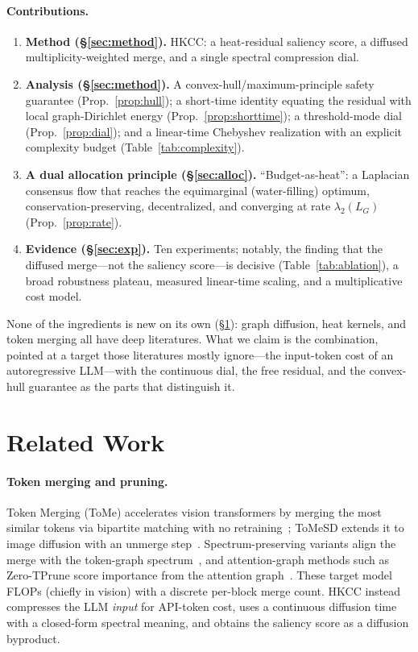 \documentclass[11pt]{article}
\begin{document}
\paragraph{Contributions.}
\begin{enumerate}
\item \textbf{Method (\S\ref{sec:method}).} HKCC: a heat-residual saliency score, a diffused
multiplicity-weighted merge, and a single spectral compression dial.
\item \textbf{Analysis (\S\ref{sec:method}).} A convex-hull/maximum-principle safety guarantee
(Prop.~\ref{prop:hull}); a short-time identity equating the residual with local graph-Dirichlet
energy (Prop.~\ref{prop:shorttime}); a threshold-mode dial (Prop.~\ref{prop:dial}); and a
linear-time Chebyshev realization with an explicit complexity budget (Table~\ref{tab:complexity}).
\item \textbf{A dual allocation principle (\S\ref{sec:alloc}).} ``Budget-as-heat'': a Laplacian
consensus flow that reaches the equimarginal (water-filling) optimum, conservation-preserving,
decentralized, and converging at rate $\lambda_2(L_G)$ (Prop.~\ref{prop:rate}).
\item \textbf{Evidence (\S\ref{sec:exp}).} Ten experiments; notably, the finding that the
diffused merge---not the saliency score---is decisive (Table~\ref{tab:ablation}), a broad
robustness plateau, measured linear-time scaling, and a multiplicative cost model.
\end{enumerate}

None of the ingredients is new on its own (\S\ref{sec:related}): graph diffusion, heat kernels,
and token merging all have deep literatures. What we claim is the combination, pointed at a target
those literatures mostly ignore---the input-token cost of an autoregressive LLM---with the
continuous dial, the free residual, and the convex-hull guarantee as the parts that distinguish it.

\section{Related Work}
\label{sec:related}

\paragraph{Token merging and pruning.}
Token Merging (ToMe) accelerates vision transformers by merging the most similar tokens via
bipartite matching with no retraining~\cite{bolya2023tome}; ToMeSD extends it to image
diffusion with an unmerge step~\cite{bolya2023tomesd}. Spectrum-preserving variants align the
merge with the token-graph spectrum~\cite{tran2024spectrum}, and attention-graph methods such as
Zero-TPrune score importance from the attention graph~\cite{wang2024zerotprune}. These target
model FLOPs (chiefly in vision) with a discrete per-block merge count. HKCC instead compresses
the LLM \emph{input} for API-token cost, uses a continuous diffusion time with a closed-form
spectral meaning, and obtains the saliency score as a diffusion byproduct.
\end{document}
